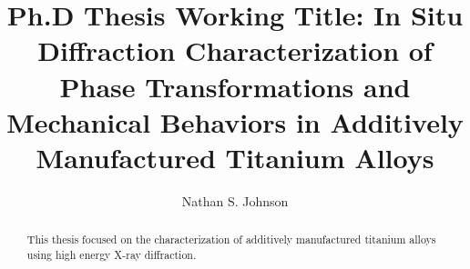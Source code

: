 \documentclass[letterpaper,12pt]{article}
\title{{\large \textbf{Ph.D Thesis Working Title:}} In Situ Diffraction Characterization of Phase Transformations and Mechanical Behaviors in Additively Manufactured Titanium Alloys}
\author{Nathan S. Johnson}
\begin{document}
\frontmatter

\maketitle
\newpage

\makecopyright{\the\year}
\newpage

\makesubmittal
\newpage

\begin{abstract}

This thesis focused on the characterization of additively manufactured titanium alloys using high energy X-ray diffraction.

\end{abstract}
\newpage

\tableofcontents
\newpage

\listoffiguresandtables
\newpage






\listofsymbols
\newpage
\end{document}

